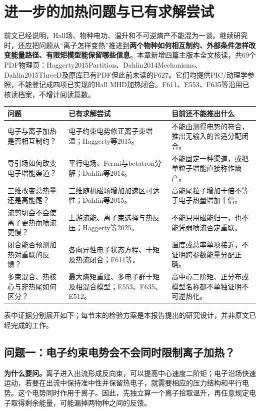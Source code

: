 \chapter{进一步的加热问题与已有求解尝试}\label{ch:further-heating}
前文已经说明，Hall场、物种电功、温升和不可逆熵产不能混为一谈。继续研究时，还应把问题从“离子怎样变热”推进到\textbf{两个物种如何相互制约、外部条件怎样改变能量路径、有限矩模型能保留哪些信息}。本章新增四篇主版本全文核读，共69个PDF物理页：Haggerty2015Partition、Dahlin2014Mechanisms、Dahlin2015ThreeD及原库已有PDF但此前未读的F627。它们均提供PIC/动理学参照，不能登记成四项已实现的Hall MHD加热闭合。F611、E553、F635等沿用已核读档案，不增计阅读篇数。

\begin{longtable}{p{}p{}p{}}
\toprule 问题 & 已有求解尝试 & 目前还不能推出什么\\\midrule\endhead
电子与离子加热是否相互制约？ & 电子约束电势修正离子束增温；Haggerty等2015。 & 不能由测得电势的符合，推出无输入的普适分配闭合。\\
导引场如何改变电子增能渠道？ & 平行电场、Fermi与betatron分解；Dahlin等2014。 & 不能固定一种渠道，或把单粒子增能直接称作熵产。\\
三维改变总热量还是高能尾？ & 三维随机磁场增加加速区可达性；Dahlin等2015。 & 高能尾粒子增加十倍不等于电子热量增加十倍。\\
流剪切会不会使离子更热而喷流更慢？ & 上游流能、离子束选择与热反压；Haggerty等2025。 & 不能只用磁能归一，也不能凭弱喷流否定重联。\\
闭合能否预测加热对重联的反馈？ & 各向异性电子状态方程、十矩及热流闭合；F611等。 & 温度或总率单项接近，不证明跨参数能量分配正确。\\
多束混合、热核心与非热尾如何区分？ & 最大熵矩重建、多电子群十矩及相混合模型；E553、F635、E512。 & 高中心二阶矩、正分布或模型名称都不单独证明不可逆热化。\\
\bottomrule
\end{longtable}
表中证据分别展开如下；每节末的检验方案是本报告提出的研究设计，并非原文已经完成的工作。

\section{问题一：电子约束电势会不会同时限制离子加热？}
\textbf{为什么要问。}离子进入出流形成反向束，可以提高中心速度二阶矩；电子沿场快速运动，若要在出流中保持准中性并保留热电子，就需要相应的压力结构和平行电势。这个电势同时作用于离子。因此，先独立算一个离子拾取温升，再任意规定电子取得剩余能量，可能漏掉两物种之间的反馈。

